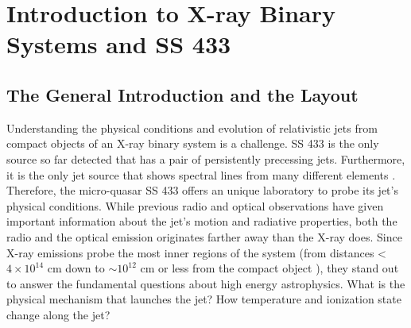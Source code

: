 



% 


\chapter{Introduction to X-ray Binary Systems and SS 433}
\section{The General Introduction and the Layout}
Understanding the physical conditions and evolution of relativistic jets from compact objects of an X-ray binary system is a challenge. SS 433 is the only source so far detected that has a pair of persistently precessing jets. Furthermore, it is the only jet source that shows spectral lines from many different elements \citep{Margon1980}. Therefore, the micro-quasar SS 433 offers an unique laboratory to probe its jet’s physical conditions. While previous radio and optical observations have given important information about the jet's motion and radiative properties, both the radio and the optical emission originates farther away than the X-ray does. Since X-ray emissions probe the most inner regions of the system (from distances \textless $4\times 10^{14}$ cm down to $\sim 10^{12}$ cm or less from the compact object \citep{Marshall2013}), they stand out to answer the fundamental questions about high energy astrophysics. What is the physical mechanism that launches the jet? How temperature and ionization state change along the jet?\par 

